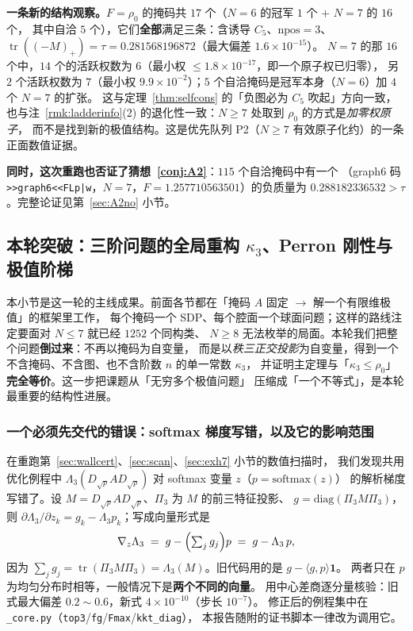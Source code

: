 \documentclass[UTF8,11pt]{ctexart}
\theoremstyle{definition}
\newcommand{\Lam}{\Lambda}
\newcommand{\tr}{\operatorname{tr}}
\begin{document}
\textbf{一条新的结构观察。}$F=\rho_0$ 的掩码共 $17$ 个（$N=6$ 的冠军 $1$ 个 $+$ $N=7$ 的 $16$ 个，
其中自洽 $5$ 个），它们\textbf{全部}满足三条：含诱导 $C_5$、$\mathrm{npos}=3$、
$\tr((-M)_+)=\tau=0.281568196872$（最大偏差 $1.6\times10^{-15}$）。
$N=7$ 的那 $16$ 个中，$14$ 个的活跃权数为 $6$（最小权 $\le1.8\times10^{-17}$，即一个原子权已归零），
另 $2$ 个活跃权数为 $7$（最小权 $9.9\times10^{-2}$）；$5$ 个自洽掩码是冠军本身（$N=6$）加 $4$ 个 $N=7$ 的扩张。
这与定理~\ref{thm:selfcons} 的「负图必为 $C_5$ 吹起」方向一致，
也与注~\ref{rmk:ladderinfo}(2) 的退化性一致：$N\ge7$ 处取到 $\rho_0$ 的方式是\emph{加零权原子}，
而不是找到新的极值结构。这是优先队列 P2（$N\ge7$ 有效原子化约）的一条正面数值证据。

\textbf{同时，这次重跑也否证了猜想~\ref{conj:A2}}：$115$ 个自洽掩码中有一个
（graph6 码 \texttt{>>graph6<<FLp|w}，$N=7$，$F=1.257710563501$）的负质量为
$0.288182336532>\tau$。完整论证见第~\ref{sec:A2no} 小节。

\subsection{本轮突破：三阶问题的全局重构 $\kappa_3$、Perron 刚性与极值阶梯}\label{sec:kappa}

本小节是这一轮的主线成果。前面各节都在「掩码 $A$ 固定 $\to$ 解一个有限维极值」的框架里工作，
每个掩码一个 SDP、每个腔面一个球面问题；这样的路线注定要面对 $N\le7$ 就已经 $1252$ 个同构类、
$N\ge8$ 无法枚举的局面。本轮我们把整个问题\textbf{倒过来}：不再以掩码为自变量，
而是以\emph{秩三正交投影}为自变量，得到一个不含掩码、不含图、也不含阶数 $n$ 的单一常数 $\kappa_3$，
并证明主定理与「$\kappa_3\le\rho_0$」\textbf{完全等价}。这一步把课题从「无穷多个极值问题」
压缩成「一个不等式」，是本轮最重要的结构性进展。

\subsubsection{一个必须先交代的错误：softmax 梯度写错，以及它的影响范围}

在重跑第~\ref{sec:wallcert}、\ref{sec:scan}、\ref{sec:exh7} 小节的数值扫描时，
我们发现共用优化例程中 $\Lam_3(D_{\sqrt p}AD_{\sqrt p})$ 对 softmax 变量 $z$（$p=\mathrm{softmax}(z)$）
的解析梯度写错了。设 $M=D_{\sqrt p}AD_{\sqrt p}$、$\Pi_3$ 为 $M$ 的前三特征投影、
$g=\mathrm{diag}(\Pi_3M\Pi_3)$，则 $\partial\Lam_3/\partial z_k=g_k-\Lam_3p_k$；写成向量形式是
\begin{equation}\label{eq:gradfix}
\nabla_z\Lam_3 \;=\; g-\Bigl(\textstyle\sum_j g_j\Bigr)p \;=\; g-\Lam_3\,p ,
\end{equation}
因为 $\sum_jg_j=\tr(\Pi_3M\Pi_3)=\Lam_3(M)$。旧代码用的是 $g-\langle g,p\rangle\mathbf 1$。
两者只在 $p$ 为均匀分布时相等，一般情况下是\textbf{两个不同的向量}。
用中心差商逐分量核验：旧式最大偏差 $0.2\sim0.6$，新式 $4\times10^{-10}$（步长 $10^{-7}$）。
修正后的例程集中在 \texttt{\_core.py}（\texttt{top3}/\texttt{fg}/\texttt{Fmax}/\texttt{kkt\_diag}），
本报告随附的证书脚本一律改为调用它。
\end{document}
